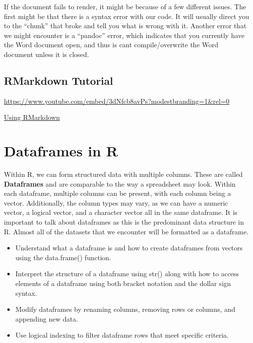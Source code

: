 \documentclass[
  letterpaper,
  DIV=11,
  numbers=noendperiod]{scrreprt}
\providecommand{\tightlist}{%
  \setlength{\itemsep}{0pt}\setlength{\parskip}{0pt}}
\begin{document}
If the document fails to render, it might be because of a few different
issues. The first might be that there is a syntax error with our code.
It will usually direct you to the ``chunk'' that broke and tell you what
is wrong with it. Another error that we might encounter is a ``pandoc''
error, which indicates that you currently have the Word document open,
and thus is cant compile/overwrite the Word document unless it is
closed.

\section{RMarkdown Tutorial}\label{rmarkdown-tutorial}

\url{https://www.youtube.com/embed/3dNfcb8avPs?modestbranding=1&rel=0}

\begin{watch}{}{}
    \href{https://youtu.be/Sm6aMty-xiE}{Using RMarkdown}
\end{watch}


\chapter{Dataframes in R}\label{dataframes-in-r}

Within R, we can form structured data with multiple columns. These are
called \textbf{Dataframes} and are comparable to the way a spreadsheet
may look. Within each dataframe, multiple columns can be present, with
each column being a vector. Additionally, the column types may vary, as
we can have a numeric vector, a logical vector, and a character vector
all in the same dataframe. It is important to talk about dataframes as
this is the predominant data structure in R. Almost all of the datasets
that we encounter will be formatted as a dataframe.

\begin{itemize}
\tightlist
\item
  Understand what a dataframe is and how to create dataframes from
  vectors using the data.frame() function.
\item
  Interpret the structure of a dataframe using str() along with how to
  access elements of a dataframe using both bracket notation and the
  dollar sign syntax.
\item
  Modify dataframes by renaming columns, removing rows or columns, and
  appending new data.
\item
  Use logical indexing to filter dataframe rows that meet specific
  criteria.
\end{itemize}
\end{document}
